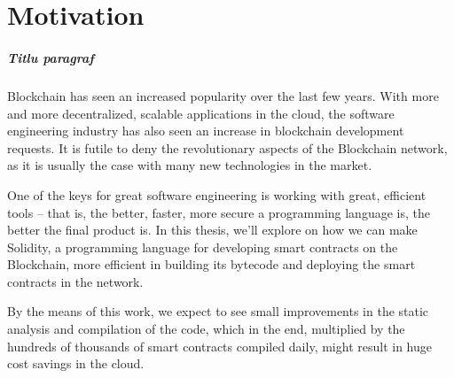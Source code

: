 \chapter*{Motivation} 

\paragraph*{Titlu paragraf}
Blockchain has seen an increased popularity over the last few years. With more and more decentralized, scalable applications in the cloud, the software engineering industry has also seen an increase in blockchain development requests. It is futile to deny the revolutionary aspects of the Blockchain network, as it is usually the case with many new technologies in the market.

One of the keys for great software engineering is working with great, efficient tools – that is, the better, faster, more secure a programming language is, the better the final product is. In this thesis, we'll explore on how we can make Solidity, a programming language for developing smart contracts on the Blockchain, more efficient in building its bytecode and deploying the smart contracts in the network.

By the means of this work, we expect to see small improvements in the static analysis and compilation of the code, which in the end, multiplied by the hundreds of thousands of smart contracts compiled daily, might result in huge cost savings in the cloud.

